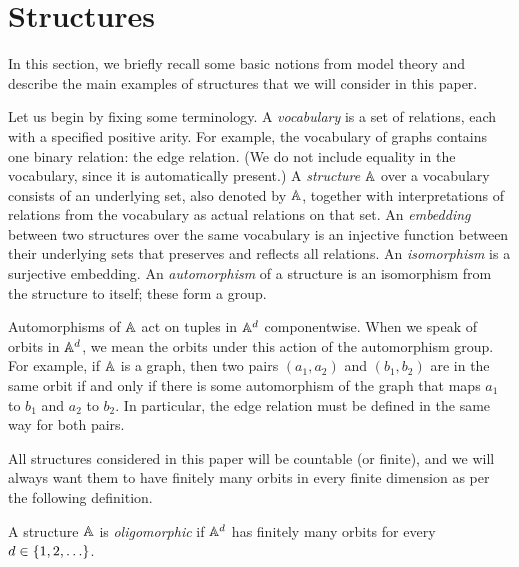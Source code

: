 \section{Structures}\label{sec:structures}

In this section, we briefly recall some basic notions from model theory and describe the main examples of structures that we will consider in this paper.

Let us begin by fixing some terminology.
A \emph{vocabulary} is a set of relations, each with a specified positive arity. %
For example, the vocabulary of graphs contains one binary relation: the edge relation. 
(We do not include equality in the vocabulary, since it is automatically present.) 
A \emph{structure} $\mathbb{A}$ over a vocabulary consists of an underlying set, also denoted by $\mathbb{A}$, together with interpretations of relations from the vocabulary as actual relations on that set. 
An \emph{embedding} between two structures over the same vocabulary is an injective function between their underlying sets that preserves and reflects all relations. 
An \emph{isomorphism} is a surjective embedding.
An \emph{automorphism} of a structure is an isomorphism from the structure to itself; these form a group. 

Automorphisms of $\mathbb{A}$ act on tuples in $\mathbb{A}^d$ componentwise. 
When we speak of orbits in $\mathbb{A}^d$, we mean the orbits under this action of the automorphism group. 
For example, if $\mathbb{A}$ is a graph, then two pairs $(a_1,a_2)$ and $(b_1,b_2)$ are in the same orbit if and only if there is some automorphism of the graph that maps $a_1$ to $b_1$ and $a_2$ to $b_2$. 
In particular, the edge relation must be defined in the same way for both pairs.

All structures considered in this paper will be countable (or finite), and we will always want them to have finitely many orbits in every finite dimension as per the following definition.

\begin{definition}\label{def:oligomorphic-structure}
    A structure $\mathbb{A}$ is \emph{oligomorphic} if $\mathbb{A}^d$ has finitely many orbits for every $d \in \{1,2,\ldots\}$.
\end{definition}

